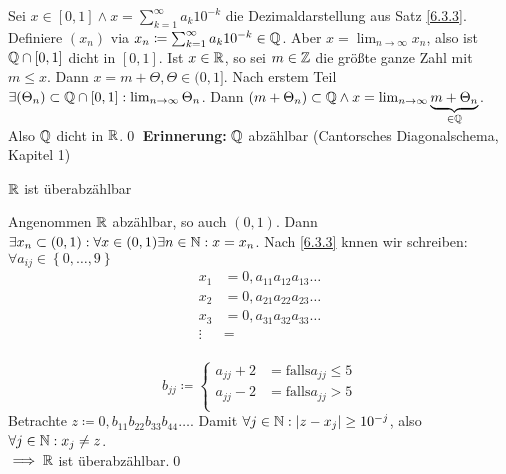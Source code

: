 \begin{subproof*}[Satz 6.3.2]
	Sei $  x \in  [0, 1] \wedge x = \sum_{k=1}^{\infty} a_k 10^{-k} $ die Dezimaldarstellung aus Satz \ref{6.3.3}. Definiere $ (x_n) $ via $ x_n \coloneqq \sum_{k=1}^{\infty} a_k 10^{-k} \in \mathbb{Q}  $. Aber $ x = \lim_{n \to \infty} x_n $, also ist $ \mathbb{Q} \cap [0, 1] $ dicht in $ [0, 1] $. Ist $ x \in  \mathbb{R}  $, so sei $ m \in  \mathbb{Z}  $ die größte ganze Zahl mit $ m \leq x $. Dann $ x = m + \Theta, \Theta \in  (0, 1] $. Nach erstem Teil $ \exists (\Theta_n) \subset \mathbb{Q}  \cap  [0, 1]: \lim_{n \to \infty}  \Theta_n $. Dann $ (m + \Theta_n) \subset  \mathbb{Q}  \wedge x = \lim_{n \to \infty} \underbrace{m + \Theta_n}_{\in \mathbb{Q} } $.
	Also $ \mathbb{Q}  $ dicht in $ \mathbb{R}  $.\qed
	\textbf{Erinnerung:} $ \mathbb{Q}  $ abzählbar (Cantorsches Diagonalschema, Kapitel 1)
\end{subproof*}

\begin{subtheorem}
	$ \mathbb{R}  $ ist überabzählbar
\end{subtheorem}
\begin{subproof}
	Angenommen $ \mathbb{R}  $ abzählbar, so auch $ (0, 1) $. Dann $ \exists x_n \subset (0, 1): \forall x \in  (0, 1) \exists n \in  \mathbb{N} : x = x_n $. Nach \ref{6.3.3} knnen wir schreiben:\\
	$ \forall a_{ij} \in \left\{ 0, \dotsc, 9 \right\}  $
	\begin{align*}
		x_1 &= 0, a_{11} a_{12} a_{13} \dotso \\
		x_2 &= 0, a_{21} a_{22} a_{23} \dotso \\
		x_3 &= 0, a_{31} a_{32} a_{33} \dotso \\
		\vdots &= ~ \\
	\end{align*}
	
	\[
		b_{jj} \coloneqq \begin{cases}
			a_{jj} + 2 &= \text{falls} a_{jj} \leq 5 \\
			a_{jj} - 2 &= \text{falls} a_{jj} > 5 \\
		\end{cases}
	\]
	Betrachte $ z \coloneqq 0, b_{11} b_{22} b_{33} b_{44} \dotso $.
	Damit $ \forall j \in \mathbb{N} : \left | z - x_j \right| \geq 10^{-j} $, also $ \forall j \in \mathbb{N} : x_j \neq z $.\\
	$ \implies \mathbb{R}  $ ist überabzählbar.\qed
\end{subproof}


